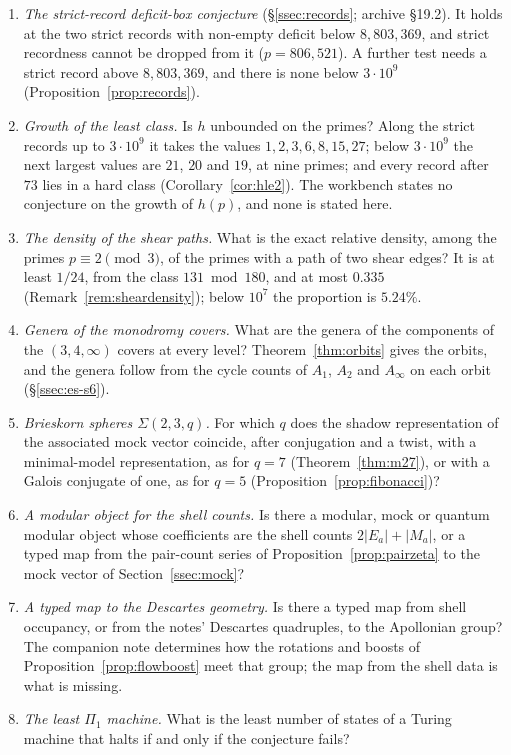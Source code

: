 \begin{enumerate}[label=\arabic*.,ref=\arabic*]
\item\label{q:deficit} \emph{The strict-record deficit-box conjecture} (§\ref{ssec:records}; archive §19.2). It holds at the two strict records with non-empty deficit below $8{,}803{,}369$, and strict recordness cannot be dropped from it ($p=806{,}521$). A further test needs a strict record above $8{,}803{,}369$, and there is none below $3\cdot10^9$ (Proposition~\ref{prop:records}).
\item\label{q:growth} \emph{Growth of the least class.} Is $h$ unbounded on the primes? Along the strict records up to $3\cdot10^9$ it takes the values $1,2,3,6,8,15,27$; below $3\cdot10^9$ the next largest values are $21$, $20$ and $19$, at nine primes; and every record after $73$ lies in a hard class (Corollary~\ref{cor:hle2}). The workbench states no conjecture on the growth of $h(p)$, and none is stated here.
\item\label{q:shear} \emph{The density of the shear paths.} What is the exact relative density, among the primes $p\equiv2\pmod3$, of the primes with a path of two shear edges? It is at least $1/24$, from the class $131\bmod180$, and at most $0.335$ (Remark~\ref{rem:sheardensity}); below $10^7$ the proportion is $5.24\%$.
\item\label{q:genera} \emph{Genera of the monodromy covers.} What are the genera of the components of the $(3,4,\infty)$ covers at every level? Theorem~\ref{thm:orbits} gives the orbits, and the genera follow from the cycle counts of $A_1$, $A_2$ and $A_\infty$ on each orbit (§\ref{ssec:es-s6}).
\item\label{q:brieskorn} \emph{Brieskorn spheres $\Sigma(2,3,q)$.} For which $q$ does the shadow representation of the associated mock vector coincide, after conjugation and a twist, with a minimal-model representation, as for $q=7$ (Theorem~\ref{thm:m27}), or with a Galois conjugate of one, as for $q=5$ (Proposition~\ref{prop:fibonacci})?
\item\label{q:modularobject} \emph{A modular object for the shell counts.} Is there a modular, mock or quantum modular object whose coefficients are the shell counts $2|E_a|+|M_a|$, or a typed map from the pair-count series of Proposition~\ref{prop:pairzeta} to the mock vector of Section~\ref{ssec:mock}?
\item\label{q:thin} \emph{A typed map to the Descartes geometry.} Is there a typed map from shell occupancy, or from the notes' Descartes quadruples, to the Apollonian group? The companion note \cite{ApollonianNote} determines how the rotations and boosts of Proposition~\ref{prop:flowboost} meet that group; the map from the shell data is what is missing.
\item\label{q:pi1} \emph{The least $\Pi_1$ machine.} What is the least number of states of a Turing machine that halts if and only if the conjecture fails?
\end{enumerate}

